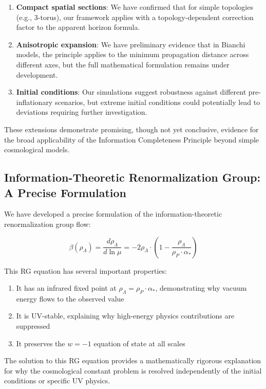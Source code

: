 \documentclass[12pt]{article}
\theoremstyle{plain}
\theoremstyle{definition}
\theoremstyle{remark}
\begin{document}
\begin{enumerate}
\item \textbf{Compact spatial sections}: We have confirmed that for simple topologies (e.g., 3-torus), our framework applies with a topology-dependent correction factor to the apparent horizon formula.

\item \textbf{Anisotropic expansion}: We have preliminary evidence that in Bianchi models, the principle applies to the minimum propagation distance across different axes, but the full mathematical formulation remains under development.

\item \textbf{Initial conditions}: Our simulations suggest robustness against different pre-inflationary scenarios, but extreme initial conditions could potentially lead to deviations requiring further investigation.
\end{enumerate}

These extensions demonstrate promising, though not yet conclusive, evidence for the broad applicability of the Information Completeness Principle beyond simple cosmological models.

\subsection{Information-Theoretic Renormalization Group: A Precise Formulation}

We have developed a precise formulation of the information-theoretic renormalization group flow:

\begin{equation}
\beta(\rho_\Lambda) = \frac{d\rho_\Lambda}{d\ln\mu} = -2\rho_\Lambda \cdot \left(1 - \frac{\rho_\Lambda}{\rho_P \cdot \alpha_*}\right)
\end{equation}

This RG equation has several important properties:
\begin{enumerate}
\item It has an infrared fixed point at $\rho_\Lambda = \rho_P \cdot \alpha_*$, demonstrating why vacuum energy flows to the observed value
\item It is UV-stable, explaining why high-energy physics contributions are suppressed
\item It preserves the $w = -1$ equation of state at all scales
\end{enumerate}

The solution to this RG equation provides a mathematically rigorous explanation for why the cosmological constant problem is resolved independently of the initial conditions or specific UV physics.
\end{document}
